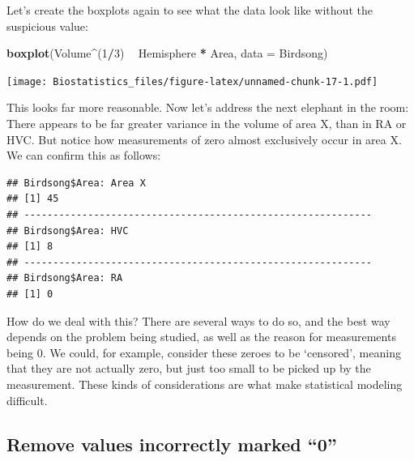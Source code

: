 \documentclass[
]{book}
\newenvironment{Shaded}{\begin{snugshade}}{\end{snugshade}}
\newcommand{\ControlFlowTok}[1]{\textcolor[rgb]{0.13,0.29,0.53}{\textbf{#1}}}
\newcommand{\DataTypeTok}[1]{\textcolor[rgb]{0.13,0.29,0.53}{#1}}
\newcommand{\DecValTok}[1]{\textcolor[rgb]{0.00,0.00,0.81}{#1}}
\newcommand{\KeywordTok}[1]{\textcolor[rgb]{0.13,0.29,0.53}{\textbf{#1}}}
\newcommand{\NormalTok}[1]{#1}
\newcommand{\OperatorTok}[1]{\textcolor[rgb]{0.81,0.36,0.00}{\textbf{#1}}}
\newcommand{\StringTok}[1]{\textcolor[rgb]{0.31,0.60,0.02}{#1}}
\begin{document}
Let's create the boxplots again to see what the data look like without the suspicious value:

\begin{Shaded}
\begin{Highlighting}[]
\KeywordTok{boxplot}\NormalTok{(Volume}\OperatorTok{^}\NormalTok{(}\DecValTok{1}\OperatorTok{/}\DecValTok{3}\NormalTok{) }\OperatorTok{~}\StringTok{ }\NormalTok{Hemisphere }\OperatorTok{*}\StringTok{ }\NormalTok{Area, }\DataTypeTok{data =}\NormalTok{ Birdsong)}
\end{Highlighting}
\end{Shaded}

\texttt{[image: Biostatistics\_files/figure-latex/unnamed-chunk-17-1.pdf]}

This looks far more reasonable. Now let's address the next elephant in the room: There appears to be far greater variance in the volume of area X, than in RA or HVC. But notice how measurements of zero almost exclusively occur in area X. We can confirm this as follows:

\begin{Shaded}
\end{Shaded}

\begin{verbatim}
## Birdsong$Area: Area X
## [1] 45
## ------------------------------------------------------------ 
## Birdsong$Area: HVC
## [1] 8
## ------------------------------------------------------------ 
## Birdsong$Area: RA
## [1] 0
\end{verbatim}

How do we deal with this? There are several ways to do so, and the best way depends on the problem being studied, as well as the reason for measurements being \(0\). We could, for example, consider these zeroes to be `censored', meaning that they are not actually zero, but just too small to be picked up by the measurement. These kinds of considerations are what make statistical modeling difficult.

\hypertarget{remove-values-incorrectly-marked-0}{%
\subsection{Remove values incorrectly marked ``0''}\label{remove-values-incorrectly-marked-0}}
\end{document}
